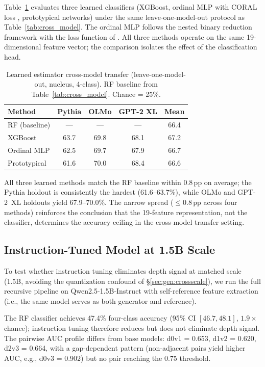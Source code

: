 Table~\ref{tab:learned_estimator} evaluates three learned classifiers (XGBoost, ordinal MLP with CORAL loss \cite{coral2020}, prototypical networks) under the same leave-one-model-out protocol as Table~\ref{tab:cross_model}.
The ordinal MLP follows the nested binary reduction framework \cite{mccullagh1980_ordinal,frank2001} with the loss function of \citet{rennie2005}.
All three methods operate on the same 19-dimensional feature vector; the comparison isolates the effect of the classification head.

\begin{table}[h]
\centering
\small
\caption{Learned estimator cross-model transfer (leave-one-model-out, nucleus, 4-class). RF baseline from Table~\ref{tab:cross_model}. Chance = 25\%.}
\label{tab:learned_estimator}
\begin{tabular}{@{}lcccc@{}}
\toprule
Method & Pythia & OLMo & GPT-2 XL & Mean \\
\midrule
RF (baseline) & --- & --- & --- & 66.4 \\
XGBoost & 63.7 & 69.8 & 68.1 & 67.2 \\
Ordinal MLP & 62.5 & 69.7 & 67.9 & 66.7 \\
Prototypical & 61.6 & 70.0 & 68.4 & 66.6 \\
\bottomrule
\end{tabular}
\end{table}

All three learned methods match the RF baseline within 0.8\,pp on average; the Pythia holdout is consistently the hardest (61.6--63.7\%), while OLMo and GPT-2~XL holdouts yield 67.9--70.0\%.
The narrow spread ($\leq$0.8\,pp across four methods) reinforces the conclusion that the 19-feature representation, not the classifier, determines the accuracy ceiling in the cross-model transfer setting.

\subsection{Instruction-Tuned Model at 1.5B Scale}
\label{app:instruct_1p5b}

To test whether instruction tuning eliminates depth signal at matched scale (1.5B, avoiding the quantization confound of \S\ref{sec:gen:crossscale}), we run the full recursive pipeline on Qwen2.5-1.5B-Instruct with self-reference feature extraction (i.e., the same model serves as both generator and reference).

The RF classifier achieves 47.4\% four-class accuracy (95\% CI $[46.7, 48.1]$, $1.9\times$ chance); instruction tuning therefore reduces but does not eliminate depth signal.
The pairwise AUC profile differs from base models: d0v1 = 0.653, d1v2 = 0.620, d2v3 = 0.664, with a gap-dependent pattern (non-adjacent pairs yield higher AUC, e.g., d0v3 = 0.902) but no pair reaching the 0.75 threshold.

